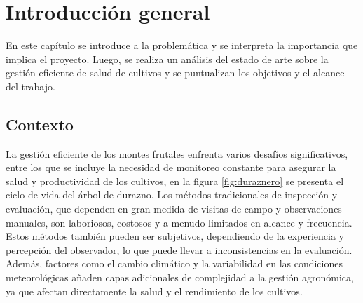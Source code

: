 
\chapter{Introducción general} %

\label{Chapter1} %
\label{IntroGeneral}

En este capítulo se introduce a la problemática y se interpreta la importancia que implica el proyecto. 
Luego, se realiza un análisis del estado de arte sobre la gestión eficiente de salud de cultivos
y se puntualizan los objetivos y el alcance del trabajo.


\newcommand{\keyword}[1]{\textbf{#1}}
\newcommand{\tabhead}[1]{\textbf{#1}}
\newcommand{\code}[1]{\texttt{#1}}
\newcommand{\file}[1]{\texttt{\bfseries#1}}
\newcommand{\option}[1]{\texttt{\itshape#1}}
\newcommand{\grados}{$^{\circ}$}



\section{Contexto}

La gestión eficiente de los montes frutales enfrenta varios desafíos significativos, entre los que se 
incluye la necesidad de monitoreo constante para asegurar la salud y productividad de los cultivos,  
en la figura \ref{fig:duraznero} se presenta el ciclo de vida del árbol de durazno. Los métodos
tradicionales de inspección y evaluación, que dependen en gran medida de visitas de campo 
y observaciones manuales, son laboriosos, costosos y a menudo limitados en alcance y frecuencia. 
Estos métodos también pueden ser subjetivos, dependiendo de la experiencia y percepción del observador,
lo que puede llevar a inconsistencias en la evaluación. Además, factores como el cambio climático y
la variabilidad en las condiciones meteorológicas añaden capas adicionales de complejidad a la gestión
agronómica, ya que afectan directamente la salud y el rendimiento de los cultivos.

